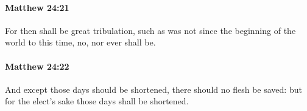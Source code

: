 		\paragraph{Matthew 24:21} %
			\label{MATTHEW-24-21}

			For then shall be great tribulation, such as was not since the beginning of the world to this time, no, nor ever shall be.

			\begin{framed}
			\scriptsize
				\begin{compactdesc}
					\item[SBLG] 
				\end{compactdesc}
			\end{framed}

		\paragraph{Matthew 24:22} %
			\label{MATTHEW-24-22}

			And except those days should be shortened, there should no flesh be saved: but for the elect's sake those days shall be shortened.

